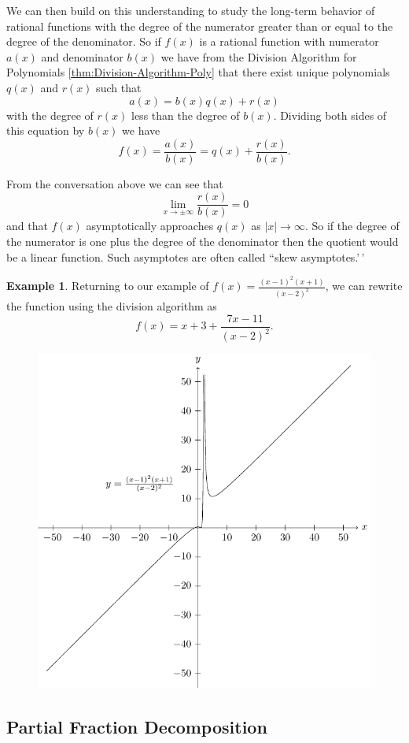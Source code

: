 \documentclass[
]{book}
\theoremstyle{definition}
\theoremstyle{definition}
\newtheorem{example}{Example}[chapter]
\theoremstyle{definition}
\theoremstyle{definition}
\theoremstyle{remark}
\begin{document}
We can then build on this understanding to study the long-term behavior of rational functions with the degree of the numerator greater than or equal to the degree of the denominator.
So if \(f(x)\) is a rational function with numerator \(a(x)\) and denominator \(b(x)\) we have from the Division Algorithm for Polynomials \ref{thm:Division-Algorithm-Poly} that there exist unique polynomials \(q(x)\) and \(r(x)\) such that
\[a(x)=b(x) q(x) + r(x)\] with the degree of \(r(x)\) less than the degree of \(b(x)\). Dividing both sides of this equation by \(b(x)\) we have
\[f(x)=\frac{a(x)}{b(x)} = q(x) + \frac{r(x)}{b(x)}.\]

From the conversation above we can see that \[\lim_{x\rightarrow \pm \infty} \frac{r(x)}{b(x)} =0\] and that \(f(x)\) asymptotically approaches \(q(x)\) as \(|x| \rightarrow \infty\). So if the degree of the numerator is one plus the degree of the denominator then the quotient would be a linear function. Such asymptotes are often called ``skew asymptotes.'\,'

\begin{example}

Returning to our example of \(f(x)=\frac{(x-1)^2(x+1)}{(x-2)^2}\), we can rewrite the function using the division algorithm as
\[f(x)= x+3 + \frac{7x-11}{(x-2)^2}.\]

\begin{figure}

{\centering \includegraphics[width=0.5\linewidth]{tikz/rational5} 

}

\end{figure}

\end{example}

\hypertarget{partial-fraction-decomposition}{%
\subsection{Partial Fraction Decomposition}\label{partial-fraction-decomposition}}
\end{document}
